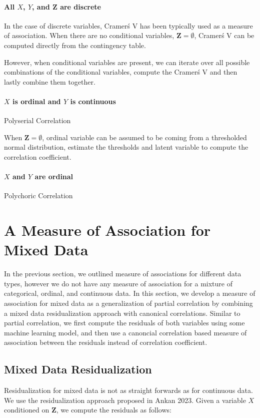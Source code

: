 \documentclass[letterpaper]{article} %
\begin{document}
\paragraph{All $ X $, $ Y $, and $ \bm{Z} $ are discrete}

In the case of discrete variables, Cramer\'s V has been typically used as a
measure of association. When there are no conditional variables, $ \bm{Z} = \emptyset $,
Cramer\'s V can be computed directly from the contingency table.

However, when conditional variables are present, we can iterate over all
possible combinations of the conditional variables, compute the Cramer\'s V and
then lastly combine them together. 


\paragraph{$ X $ is ordinal and $ Y $ is continuous}
Polyserial Correlation

When $ \bm{Z} = \emptyset $, ordinal variable can be assumed to be coming from a thresholded normal distribution, estimate the thresholds and latent variable to compute 
the correlation coefficient.

\paragraph{$ X $ and $ Y $ are ordinal}
Polychoric Correlation

\section{A Measure of Association for Mixed Data}
\label{sec:mixed_association}
In the previous section, we outlined measure of associations for different data
types, however we do not have any measure of association for a mixture of
categorical, ordinal, and continuous data. In this section, we develop a
measure of association for mixed data as a generalization of partial
correlation by combining a mixed data residualization approach with canonical
correlations. Similar to partial correlation, we first compute the residuals of
both variables using some machine learning model, and then use a canoncial
correlation based measure of association between the residuals instead of
correlation coefficient.

\subsection{Mixed Data Residualization}
Residualization for mixed data is not as straight forwards as for continuous
data. We use the residualization approach proposed in Ankan 2023. Given a variable
$ X $ conditioned on $ \bm{Z} $, we compute the residuals as follows:
\end{document}

